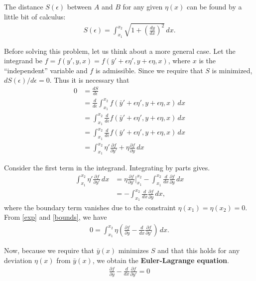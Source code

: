 \documentclass{article}
\newcommand{\p}{\partial}
\newcommand{\f}[2]{\frac{#1}{#2}}
\newcommand{\lp}{\left(}
\newcommand{\rp}{\right)}
\begin{document}
The distance $S(\epsilon)$ between $A$ and $B$ for any given $\eta(x)$ can be found by a little bit of calculus:
\begin{align}
S(\epsilon) = \int^{x_2}_{x_1}\sqrt{1 + \left(\frac{dy}{dx}\right)^2}\,dx.
\end{align}

Before solving this problem, let us think about a more general case. Let the integrand be $f = f(y',y,x) = f(\bar{y}'+\epsilon\eta',y+\epsilon\eta,x)$, where $x$ is the ``independent'' variable and $f$ is admissible. Since we require that $S$ is minimized, $dS(\epsilon)/d\epsilon = 0$. Thus it is necessary that
\begin{align}\label{exp}
0 &= \f{dS}{d\epsilon} \nonumber\\ 
&= \f{d}{d\epsilon}\int^{x_2}_{x_1}f(\bar{y}'+\epsilon\eta',y+\epsilon\eta,x)\,dx \nonumber\\
&= \int^{x_2}_{x_1}\f{d}{d\epsilon}f(\bar{y}'+\epsilon\eta',y+\epsilon\eta,x)\,dx \nonumber\\
&= \int^{x_2}_{x_1}\f{d}{d\epsilon}f(\bar{y}'+\epsilon\eta',y+\epsilon\eta,x)\,dx \nonumber\\
&= \int^{x_2}_{x_1}\eta'\f{\p f}{\p y'} + \eta\f{\p f}{\p y}\,dx 
\end{align}

Consider the first term in the integrand. Integrating by parts gives.
\begin{align}\label{bounds}
\int^{x_2}_{x_1}\eta'\f{\p f}{\p y'} \,dx
&= \eta\f{\p f}{\p y'}\bigg\vert_{x_1}^{x_2} -  \int^{x_2}_{x_1}  \f{d}{dx}\f{\p f}{\p y} \,dx \nonumber\\
&= -  \int^{x_2}_{x_1}  \f{d}{dx}\f{\p f}{\p y} \,dx,
\end{align} 
where the boundary term vanishes due to the constraint $\eta(x_1) = \eta(x_2) = 0$. From \eqref{exp} and \eqref{bounds}, we have
\begin{align}
0 = \int^{x_2}_{x_1} \eta\lp \f{\p f}{\p y} - \f{d}{dx}\f{\p f}{\p y'}  \rp\,dx. 
\end{align}

Now, because we require that $\bar{y}(x)$ minimizes $S$ and that this holds for any deviation $\eta(x)$ from $\bar{y}(x)$, we obtain the \textbf{Euler-Lagrange equation}. 
\begin{align}
\boxed{\f{\p f}{\p y} - \f{d}{dx}\f{\p f}{\p y'} = 0}
\end{align}
\end{document}
